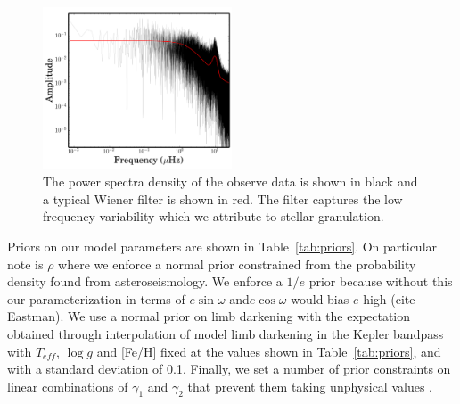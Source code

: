 \documentclass[apjl]{emulateapj}
\begin{document}
\begin{figure}
\includegraphics[width=0.50\textwidth]{filter.png}
\caption{The power spectra density of the observe data is shown in black and a typical Wiener filter is shown in red. The filter captures the low frequency variability which we attribute to stellar granulation. }
\label{fig:filter}
\end{figure}


Priors on our model parameters are shown in Table~\ref{tab:priors}. On particular note is $\rho$ where we enforce a normal prior constrained from the probability density found from asteroseismology. We enforce a $1/e$ prior because without this our parameterization in terms of $e\sin{\omega}$ and$e\cos{\omega}$ would bias $e$ high (cite Eastman). We use a normal prior on limb darkening with the expectation obtained through interpolation of model limb darkening in the Kepler bandpass with $T_{eff}$, $\log{g}$ and [Fe/H] fixed at the values shown in Table~\ref{tab:priors}, and with a standard deviation of 0.1. Finally, we set a number of prior constraints on linear combinations of $\gamma_1$ and $\gamma_2$ that prevent them taking unphysical values \citep{burke08}.
\end{document}
